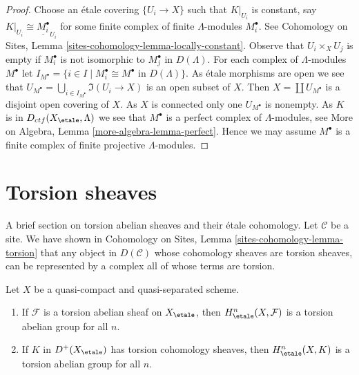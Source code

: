 \begin{proof}
Choose an \'etale covering $\{U_i \to X\}$ such that $K|_{U_i}$
is constant, say $K|_{U_i} \cong \underline{M_i^\bullet}_{U_i}$
for some finite complex of finite $\Lambda$-modules $M_i^\bullet$.
See Cohomology on Sites, Lemma
\ref{sites-cohomology-lemma-locally-constant}.
Observe that $U_i \times_X U_j$ is empty if $M_i^\bullet$
is not isomorphic to $M_j^\bullet$ in $D(\Lambda)$.
For each complex of $\Lambda$-modules $M^\bullet$ let
$I_{M^\bullet} =
\{i \in I \mid M_i^\bullet \cong M^\bullet\text{ in }D(\Lambda)\}$.
As \'etale morphisms are open we see that
$U_{M^\bullet} = \bigcup_{i \in I_{M^\bullet}} \Im(U_i \to X)$
is an open subset of $X$. Then $X = \coprod U_{M^\bullet}$ is a disjoint
open covering of $X$. As $X$ is connected only one $U_{M^\bullet}$
is nonempty. As $K$ is in $D_{ctf}(X_\etale, \Lambda)$ we see that $M^\bullet$
is a perfect complex of $\Lambda$-modules, see
More on Algebra, Lemma \ref{more-algebra-lemma-perfect}.
Hence we may assume $M^\bullet$ is a finite complex of finite projective
$\Lambda$-modules.
\end{proof}








\section{Torsion sheaves}
\label{section-torsion}

\noindent
A brief section on torsion abelian sheaves and their \'etale cohomology.
Let $\mathcal{C}$ be a site. We have shown in
Cohomology on Sites, Lemma \ref{sites-cohomology-lemma-torsion}
that any object in $D(\mathcal{C})$ whose cohomology sheaves are
torsion sheaves, can be represented by a complex all of whose terms
are torsion.

\begin{lemma}
\label{lemma-torsion-cohomology}
Let $X$ be a quasi-compact and quasi-separated scheme.
\begin{enumerate}
\item If $\mathcal{F}$ is a torsion abelian sheaf on $X_\etale$, then
$H^n_\etale(X, \mathcal{F})$ is a torsion abelian group for all $n$.
\item If $K$ in $D^+(X_\etale)$ has torsion cohomology sheaves, then
$H^n_\etale(X, K)$ is a torsion abelian group for all $n$.
\end{enumerate}
\end{lemma}

